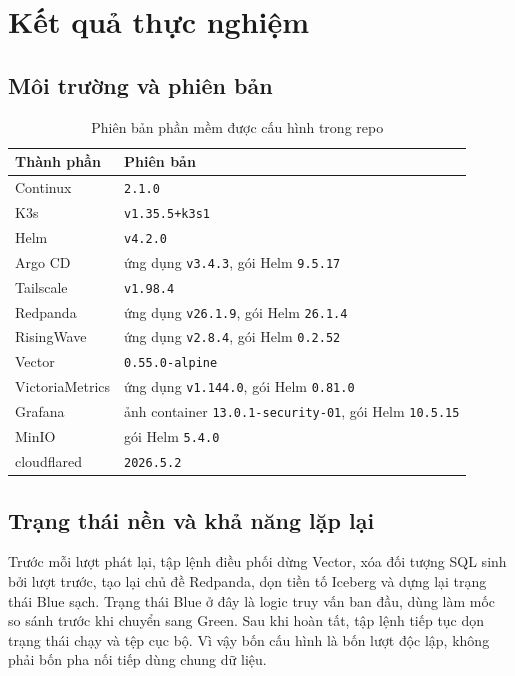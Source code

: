 \section{Kết quả thực nghiệm}\label{sec:results}

\subsection{Môi trường và phiên bản}
\begin{table}[H]
\centering
\caption{Phiên bản phần mềm được cấu hình trong repo}
\label{tab:versions-vi}
\begin{tabular}{@{}ll@{}}
\toprule
\textbf{Thành phần} & \textbf{Phiên bản}\\
\midrule
Continux & \texttt{2.1.0}\\
K3s & \texttt{v1.35.5+k3s1}\\
Helm & \texttt{v4.2.0}\\
Argo CD & ứng dụng \texttt{v3.4.3}, gói Helm \texttt{9.5.17}\\
Tailscale & \texttt{v1.98.4}\\
Redpanda & ứng dụng \texttt{v26.1.9}, gói Helm \texttt{26.1.4}\\
RisingWave & ứng dụng \texttt{v2.8.4}, gói Helm \texttt{0.2.52}\\
Vector & \texttt{0.55.0-alpine}\\
VictoriaMetrics & ứng dụng \texttt{v1.144.0}, gói Helm \texttt{0.81.0}\\
Grafana & ảnh container \texttt{13.0.1-security-01}, gói Helm \texttt{10.5.15}\\
MinIO & gói Helm \texttt{5.4.0}\\
cloudflared & \texttt{2026.5.2}\\
\bottomrule
\end{tabular}
\end{table}

\subsection{Trạng thái nền và khả năng lặp lại}
Trước mỗi lượt phát lại, tập lệnh điều phối dừng Vector, xóa đối tượng SQL sinh bởi lượt trước, tạo lại chủ đề Redpanda, dọn tiền tố Iceberg và dựng lại trạng thái Blue sạch. Trạng thái Blue ở đây là logic truy vấn ban đầu, dùng làm mốc so sánh trước khi chuyển sang Green. Sau khi hoàn tất, tập lệnh tiếp tục dọn trạng thái chạy và tệp cục bộ. Vì vậy bốn cấu hình là bốn lượt độc lập, không phải bốn pha nối tiếp dùng chung dữ liệu.


